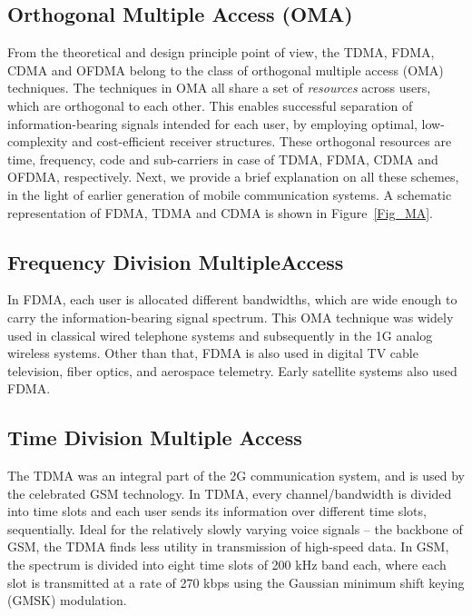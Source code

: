 \begin{multicols}{2}
\section{Orthogonal Multiple Access (OMA)} \label{Sec_OMA}
From the theoretical and design principle point of view, the TDMA, FDMA, CDMA and OFDMA belong to the class of orthogonal multiple access (OMA) techniques. The techniques in OMA all share a set of \emph{resources} across users, which are orthogonal to each other. This enables successful separation of information-bearing signals intended for each user, by employing optimal, low-complexity and cost-efficient receiver structures. These orthogonal resources are time, frequency, code and sub-carriers in case of TDMA, FDMA, CDMA and OFDMA, respectively. Next, we provide a brief explanation on all these schemes, in the light of earlier generation of mobile communication systems. A schematic representation of FDMA, TDMA and CDMA is shown in Figure~\ref{Fig_MA}.

\subsection{Frequency Division Multiple\hfill\break Access}
In FDMA, each user is allocated different bandwidths, which are wide enough to carry the information-bearing signal spectrum. This OMA technique was widely used in classical wired telephone systems and subsequently in the 1G analog wireless systems. Other than that, FDMA is also used in digital TV cable television, fiber optics, and aerospace telemetry. Early satellite systems also used FDMA.

\subsection{Time Division Multiple Access}
The TDMA was an integral part of the 2G communication system, and is used by the celebrated GSM technology. In TDMA, every channel/bandwidth is divided into time slots and each user sends its information over different time slots, sequentially. Ideal for the relatively slowly varying voice signals -- the backbone of GSM, the TDMA finds less utility in transmission of high-speed data. In GSM, the spectrum is divided into eight time slots of 200 kHz band each, where each slot is transmitted at a rate of 270 kbps using the Gaussian minimum shift keying (GMSK) modulation.


\end{multicols}
